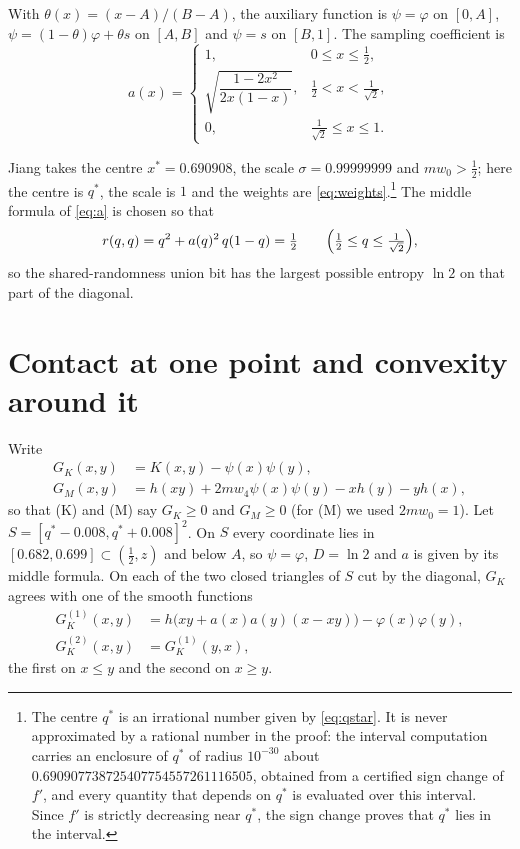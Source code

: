\documentclass[12pt]{article}
\theoremstyle{plain}
\newcommand{\qs}{q^{*}}
\begin{document}
With $\theta(x)=(x-A)/(B-A)$, the auxiliary function is $\psi=\varphi$ on $[0,A]$, $\psi=(1-\theta)\varphi+\theta s$ on $[A,B]$ and $\psi=s$ on $[B,1]$. The sampling coefficient is
\begin{equation}\label{eq:a}
a(x)=\begin{cases}1, & 0\le x\le\frac12,\\[2pt] \sqrt{\dfrac{1-2x^2}{2x(1-x)}}, & \frac12<x<\frac1{\sqrt2},\\[6pt] 0, & \frac1{\sqrt2}\le x\le 1.\end{cases}
\end{equation}

Jiang takes the centre $x^*=0.690908$, the scale $\sigma=0.99999999$ and $mw_0>\frac12$; here the centre is $\qs$, the scale is $1$ and the weights are \eqref{eq:weights}.\footnote{The centre $\qs$ is an irrational number given by \eqref{eq:qstar}. It is never approximated by a rational number in the proof: the interval computation carries an enclosure of $\qs$ of radius $10^{-30}$ about $0.690907738725407754557261116505$, obtained from a certified sign change of $f'$, and every quantity that depends on $\qs$ is evaluated over this interval. Since $f'$ is strictly decreasing near $\qs$, the sign change proves that $\qs$ lies in the interval.} The middle formula of \eqref{eq:a} is chosen so that
\begin{equation}\label{eq:rdiag}
r(q,q)=q^2+a(q)^2\,q(1-q)=\tfrac12\qquad\Bigl(\tfrac12\le q\le\tfrac{1}{\sqrt2}\Bigr),
\end{equation}
so the shared-randomness union bit has the largest possible entropy $\ln 2$ on that part of the diagonal.

\section{Contact at one point and convexity around it}\label{sec:tangency}

Write
\begin{align*}
G_K(x,y)&=K(x,y)-\psi(x)\psi(y),\\
G_M(x,y)&=h(xy)+2mw_4\psi(x)\psi(y)-xh(y)-yh(x),
\end{align*}
so that (K) and (M) say $G_K\ge 0$ and $G_M\ge 0$ (for (M) we used $2mw_0=1$). Let $S=[\qs-0.008,\qs+0.008]^2$. On $S$ every coordinate lies in $[0.682,0.699]\subset(\frac12,z)$ and below $A$, so $\psi=\varphi$, $D=\ln 2$ and $a$ is given by its middle formula. On each of the two closed triangles of $S$ cut by the diagonal, $G_K$ agrees with one of the smooth functions
\begin{align*}
G_K^{(1)}(x,y)&=h\bigl(xy+a(x)a(y)(x-xy)\bigr)-\varphi(x)\varphi(y),\\
G_K^{(2)}(x,y)&=G_K^{(1)}(y,x),
\end{align*}
the first on $x\le y$ and the second on $x\ge y$.
\end{document}
